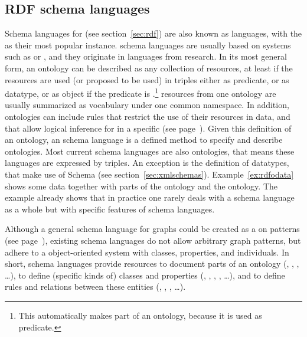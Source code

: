 \subsection{RDF schema languages}
\label{sec:rdfschemas}

Schema languages for  (see section~\ref{sec:rdf}) are also known as
 languages, with the  as their
most popular instance.   schema languages are usually based on
 systems such as  or
, and they originate in 
languages from  research.  In its most general
form, an  ontology can be described as any collection of 
resources, at least if the resources are used (or proposed to be used) in
 triples either as predicate, or as datatype, or as object if the
predicate is .\footnote{This automatically makes 
part of an ontology, because it is used as predicate.}  resources
from one ontology are usually summarized as  vocabulary under one
common namespace. In addition, ontologies can include rules that restrict the
use of their resources in  data, and that allow logical inference for
 in a specific  (see
page~\pageref{page:entailment}).  Given this definition of an ontology, an
 schema language is a defined method to specify and describe
ontologies.  Most current  schema languages are also 
ontologies, that means these languages are expressed by  triples. An
exception is the definition of  datatypes, that make use of
 Schema (see section~\ref{sec:xmlschemas}). Example~\ref{ex:rdfodata}
shows some  data together with parts of the  ontology and the  ontology.  The example already
shows that in practice one rarely deals with a schema language as a whole but
with specific features of schema languages.

Although a general schema language for  graphs could be created as a
 on  patterns (see
page~\pageref{p:rewritingsystem}), existing schema languages do not allow
arbitrary graph patterns, but adhere to a object-oriented system with classes,
properties, and individuals. In short,  schema languages provide
resources to document parts of an ontology (,
, , \ldots), to define
(specific kinds of) classes and properties (, ,
, ,
\ldots), and to define rules and relations between
these entities (, ,
, \ldots).  

